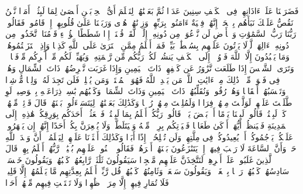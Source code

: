 \startbuffer[\q:18:11]
فَضَرَبۡنَا عَلَىٰۤ ءَاذَانِهِمۡ فِی ٱلۡكَهۡفِ سِنِینَ عَدَدࣰا%
\stopbuffer%
\startbuffer[\q:18:12]
ثُمَّ بَعَثۡنَٰهُمۡ لِنَعۡلَمَ أَیُّ ٱلۡحِزۡبَیۡنِ أَحۡصَىٰ لِمَا لَبِثُوۤا۟ أَمَدࣰا%
\stopbuffer%
\startbuffer[\q:18:13]
نَّحۡنُ نَقُصُّ عَلَیۡكَ نَبَأَهُم بِٱلۡحَقِّۚ إِنَّهُمۡ فِتۡیَةٌ ءَامَنُوا۟ بِرَبِّهِمۡ وَزِدۡنَٰهُمۡ هُدࣰى%
\stopbuffer%
\startbuffer[\q:18:14]
وَرَبَطۡنَا عَلَىٰ قُلُوبِهِمۡ إِذۡ قَامُوا۟ فَقَالُوا۟ رَبُّنَا رَبُّ ٱلسَّمَٰوَٰتِ وَٱلۡأَرۡضِ لَن نَّدۡعُوَا۟ مِن دُونِهِۦۤ إِلَٰهࣰاۖ لَّقَدۡ قُلۡنَاۤ إِذࣰا شَطَطًا%
\stopbuffer%
\startbuffer[\q:18:15]
هَٰۤؤُلَاۤءِ قَوۡمُنَا ٱتَّخَذُوا۟ مِن دُونِهِۦۤ ءَالِهَةࣰۖ لَّوۡلَا یَأۡتُونَ عَلَیۡهِم بِسُلۡطَٰنِۭ بَیِّنࣲۖ فَمَنۡ أَظۡلَمُ مِمَّنِ ٱفۡتَرَىٰ عَلَى ٱللَّهِ كَذِبࣰا%
\stopbuffer%
\startbuffer[\q:18:16]
وَإِذِ ٱعۡتَزَلۡتُمُوهُمۡ وَمَا یَعۡبُدُونَ إِلَّا ٱللَّهَ فَأۡوُۥۤا۟ إِلَى ٱلۡكَهۡفِ یَنشُرۡ لَكُمۡ رَبُّكُم مِّن رَّحۡمَتِهِۦ وَیُهَیِّئۡ لَكُم مِّنۡ أَمۡرِكُم مِّرۡفَقࣰا%
\stopbuffer%
\startbuffer[\q:18:17]
۞ وَتَرَى ٱلشَّمۡسَ إِذَا طَلَعَت تَّزَٰوَرُ عَن كَهۡفِهِمۡ ذَاتَ ٱلۡیَمِینِ وَإِذَا غَرَبَت تَّقۡرِضُهُمۡ ذَاتَ ٱلشِّمَالِ وَهُمۡ فِی فَجۡوَةࣲ مِّنۡهُۚ ذَٰلِكَ مِنۡ ءَایَٰتِ ٱللَّهِۗ مَن یَهۡدِ ٱللَّهُ فَهُوَ ٱلۡمُهۡتَدِۖ وَمَن یُضۡلِلۡ فَلَن تَجِدَ لَهُۥ وَلِیࣰّا مُّرۡشِدࣰا%
\stopbuffer%
\startbuffer[\q:18:18]
وَتَحۡسَبُهُمۡ أَیۡقَاظࣰا وَهُمۡ رُقُودࣱۚ وَنُقَلِّبُهُمۡ ذَاتَ ٱلۡیَمِینِ وَذَاتَ ٱلشِّمَالِۖ وَكَلۡبُهُم بَٰسِطࣱ ذِرَاعَیۡهِ بِٱلۡوَصِیدِۚ لَوِ ٱطَّلَعۡتَ عَلَیۡهِمۡ لَوَلَّیۡتَ مِنۡهُمۡ فِرَارࣰا وَلَمُلِئۡتَ مِنۡهُمۡ رُعۡبࣰا%
\stopbuffer%
\startbuffer[\q:18:19]
وَكَذَٰلِكَ بَعَثۡنَٰهُمۡ لِیَتَسَاۤءَلُوا۟ بَیۡنَهُمۡۚ قَالَ قَاۤئِلࣱ مِّنۡهُمۡ كَمۡ لَبِثۡتُمۡۖ قَالُوا۟ لَبِثۡنَا یَوۡمًا أَوۡ بَعۡضَ یَوۡمࣲۚ قَالُوا۟ رَبُّكُمۡ أَعۡلَمُ بِمَا لَبِثۡتُمۡ فَٱبۡعَثُوۤا۟ أَحَدَكُم بِوَرِقِكُمۡ هَٰذِهِۦۤ إِلَى ٱلۡمَدِینَةِ فَلۡیَنظُرۡ أَیُّهَاۤ أَزۡكَىٰ طَعَامࣰا فَلۡیَأۡتِكُم بِرِزۡقࣲ مِّنۡهُ وَلۡیَتَلَطَّفۡ وَلَا یُشۡعِرَنَّ بِكُمۡ أَحَدًا%
\stopbuffer%
\startbuffer[\q:18:20]
إِنَّهُمۡ إِن یَظۡهَرُوا۟ عَلَیۡكُمۡ یَرۡجُمُوكُمۡ أَوۡ یُعِیدُوكُمۡ فِی مِلَّتِهِمۡ وَلَن تُفۡلِحُوۤا۟ إِذًا أَبَدࣰا%
\stopbuffer%
\startbuffer[\q:18:21]
وَكَذَٰلِكَ أَعۡثَرۡنَا عَلَیۡهِمۡ لِیَعۡلَمُوۤا۟ أَنَّ وَعۡدَ ٱللَّهِ حَقࣱّ وَأَنَّ ٱلسَّاعَةَ لَا رَیۡبَ فِیهَاۤ إِذۡ یَتَنَٰزَعُونَ بَیۡنَهُمۡ أَمۡرَهُمۡۖ فَقَالُوا۟ ٱبۡنُوا۟ عَلَیۡهِم بُنۡیَٰنࣰاۖ رَّبُّهُمۡ أَعۡلَمُ بِهِمۡۚ قَالَ ٱلَّذِینَ غَلَبُوا۟ عَلَىٰۤ أَمۡرِهِمۡ لَنَتَّخِذَنَّ عَلَیۡهِم مَّسۡجِدࣰا%
\stopbuffer%
\startbuffer[\q:18:22]
سَیَقُولُونَ ثَلَٰثَةࣱ رَّابِعُهُمۡ كَلۡبُهُمۡ وَیَقُولُونَ خَمۡسَةࣱ سَادِسُهُمۡ كَلۡبُهُمۡ رَجۡمَۢا بِٱلۡغَیۡبِۖ وَیَقُولُونَ سَبۡعَةࣱ وَثَامِنُهُمۡ كَلۡبُهُمۡۚ قُل رَّبِّیۤ أَعۡلَمُ بِعِدَّتِهِم مَّا یَعۡلَمُهُمۡ إِلَّا قَلِیلࣱۗ فَلَا تُمَارِ فِیهِمۡ إِلَّا مِرَاۤءࣰ ظَٰهِرࣰا وَلَا تَسۡتَفۡتِ فِیهِم مِّنۡهُمۡ أَحَدࣰا%

